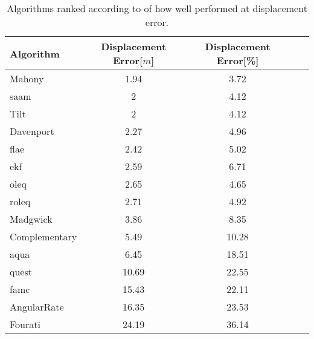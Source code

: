 \begin{table}[H]
    \begin{center}
        \begin{tabular}[t]{lcccc}
            \hline
            Algorithm        & Displacement Error[$m$] & Displacement Error[\%] \\
            \hline
            Mahony           & 1.94                    & 3.72                   \\
            \acrshort{saam}  & 2                       & 4.12                   \\
            Tilt             & 2                       & 4.12                   \\
            Davenport        & 2.27                    & 4.96                   \\
            \acrshort{flae}  & 2.42                    & 5.02                   \\
            \acrshort{ekf}   & 2.59                    & 6.71                   \\
            \acrshort{oleq}  & 2.65                    & 4.65                   \\
            \acrshort{roleq} & 2.71                    & 4.92                   \\
            Madgwick         & 3.86                    & 8.35                   \\
            Complementary    & 5.49                    & 10.28                  \\
            \acrshort{aqua}  & 6.45                    & 18.51                  \\
            \acrshort{quest} & 10.69                   & 22.55                  \\
            \acrshort{famc}  & 15.43                   & 22.11                  \\
            AngularRate      & 16.35                   & 23.53                  \\
            Fourati          & 24.19                   & 36.14                  \\
        \end{tabular}
        \caption{ Algorithms ranked according to of how well performed at displacement error. }
        \label{tab:ranked_displacement}
    \end{center}
\end{table}